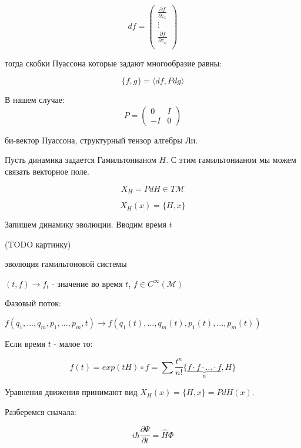 \begin{equation}
    df = \left( \begin{align}
                  \frac{\partial f}{\partial z_1}\\
                  \vdots\\
                  \frac{\partial f}{\partial z_n}\\
                \end{align}
         \right)
\end{equation}

тогда скобки Пуассона которые задают многообразие равны:

$$ \{f,g\} = \langle df,Pdg\rangle$$

В нашем случае:
\begin{equation}
P = \left(\begin{matrix} 0 & I \\ -I & 0\end{matrix}\right)
\end{equation}

би-вектор Пуассона, структурный тензор алгебры Ли.


Пусть динамика задается Гамильтонианом $H$. С этим гамильтонианом
мы можем связать векторное поле.

$$X_H = P dH \in T\mathcal M$$

$$X_H(x) = \{H,x\}$$

Запишем динамику эволюции. Вводим время $t$

(TODO картинку)

\begin{definition}
  эволюция гамильтоновой системы

  $(t,f) \rightarrow f_t$ - значение во время $t$, $f\in C^\infty(\mathcal M)$
\end{definition}

Фазовый поток:

$f(q_1,\ldots,q_m,p_1,\ldots,p_m,t) \rightarrow f(q_1(t),\ldots,q_m(t),p_1(t),\ldots,p_m(t))$ 

Если время $t$ - малое то:

$$f(t) = exp(tH) \circ f = \sum \frac{t^n}{n!} \{\underbrace{f\cdot f\cdot \ldots \cdot f}_{n},H\}$$

Уравнения движения принимают вид $X_H(x) = \{H,x\} = P dH(x)$.

Разберемся сначала:

\begin{equation}
     i \hbar \frac{\partial \Psi}{\partial t} = \hat H \Phi
\end{equation}

